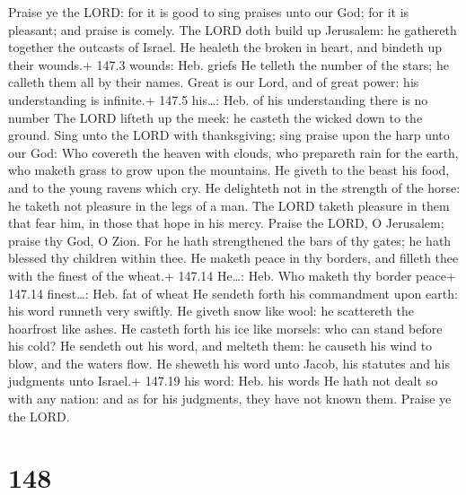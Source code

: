  Praise ye the LORD: for it is good to sing praises unto our
God; for it is pleasant; and praise is comely.  The LORD
doth build up Jerusalem: he gathereth together the outcasts of Israel.
 He healeth the broken in heart, and bindeth up their
wounds.+ 147.3 wounds: Heb. griefs  He telleth the number of
the stars; he calleth them all by their names.  Great is our
Lord, and of great power: his understanding is infinite.+ 147.5
his\ldots: Heb. of his understanding there is no number  The
LORD lifteth up the meek: he casteth the wicked down to the ground.
 Sing unto the LORD with thanksgiving; sing praise upon the
harp unto our God:  Who covereth the heaven with clouds, who
prepareth rain for the earth, who maketh grass to grow upon the
mountains.  He giveth to the beast his food, and to the
young ravens which cry.  He delighteth not in the strength
of the horse: he taketh not pleasure in the legs of a man. 
The LORD taketh pleasure in them that fear him, in those that hope in
his mercy.  Praise the LORD, O Jerusalem; praise thy God, O
Zion.  For he hath strengthened the bars of thy gates; he
hath blessed thy children within thee.  He maketh peace in
thy borders, and filleth thee with the finest of the wheat.+ 147.14
He\ldots: Heb. Who maketh thy border peace+ 147.14 finest\ldots: Heb.
fat of wheat  He sendeth forth his commandment upon earth:
his word runneth very swiftly.  He giveth snow like wool:
he scattereth the hoarfrost like ashes.  He casteth forth
his ice like morsels: who can stand before his cold?  He
sendeth out his word, and melteth them: he causeth his wind to blow, and
the waters flow.  He sheweth his word unto Jacob, his
statutes and his judgments unto Israel.+ 147.19 his word: Heb. his words
 He hath not dealt so with any nation: and as for his
judgments, they have not known them. Praise ye the LORD.

\hypertarget{section-148}{%
\section{148}\label{section-148}}

